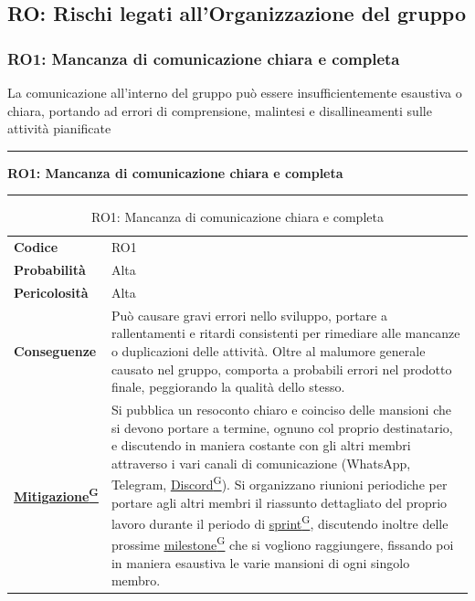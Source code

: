 \documentclass[a4paper,12pt]{article}
\providecommand{\glslink}[2]{\href{https://alittlebyte-19.github.io/Documentazione/glossario.html\#gls-#1}{\underline{#2}\textsuperscript{\scriptsize G}}}
\begin{document}
\subsection{RO: Rischi legati all'Organizzazione del gruppo}
\subsubsection{RO1: Mancanza di comunicazione chiara e completa}
La comunicazione all'interno del gruppo può essere insufficientemente esaustiva o chiara, portando ad errori di comprensione, malintesi 
e disallineamenti sulle attività pianificate

\vspace{0.5cm}
\hrule
\vspace{0.5em}
\textbf{RO1: Mancanza di comunicazione chiara e completa}
\vspace{0.5em}
\hrule
\vspace{1cm}

\begin{table}[h]
\begin{tabular}{>{\bfseries}p{3cm} | p{12.2cm}}
Codice & RO1 \\

Probabilità & Alta\\

Pericolosità & Alta\\

Conseguenze & Può causare gravi errori nello sviluppo, portare a rallentamenti e ritardi consistenti per rimediare alle mancanze o duplicazioni delle attività.
Oltre al malumore generale causato nel gruppo, comporta a probabili errori nel prodotto finale, peggiorando la qualità dello stesso.\\

\glslink{mitigazione-dei-rischi}{Mitigazione} & Si pubblica un resoconto chiaro e coinciso delle mansioni che si devono portare a termine, ognuno col proprio destinatario, e discutendo in maniera costante con gli altri membri attraverso i vari canali di comunicazione (WhatsApp, Telegram, \glslink{discord}{Discord}). Si organizzano riunioni periodiche per portare agli altri membri il riassunto dettagliato del proprio lavoro durante il periodo di \glslink{sprint}{sprint}, discutendo inoltre delle prossime \glslink{milestone}{milestone} che si vogliono raggiungere, fissando poi in maniera esaustiva le varie mansioni di ogni singolo membro.\\
\end{tabular}
\caption{RO1: Mancanza di comunicazione chiara e completa}
\end{table}
\newpage
\end{document}

